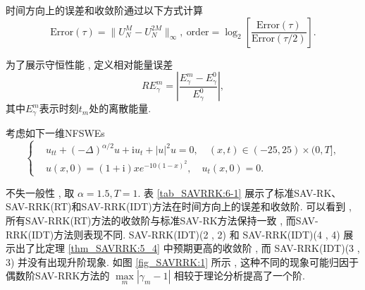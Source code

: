 时间方向上的误差和收敛阶通过以下方式计算
\begin{equation}
	\text{Error}(\tau) = \|U_{N}^{M}-U_{N}^{2 M}\|_{\infty} , ~\text{order} = \log_{2}\left[\frac{\text{Error}(\tau)}{\text{Error}(\tau / 2)}\right].\label{eq_SAVRRK:104}
\end{equation}

为了展示守恒性能 , 定义相对能量误差
\begin{equation}\label{eq_SAVRRK:105}
	R E_{\gamma}^{m} = \left|\frac{E_{\gamma}^{m}-E_{\gamma}^{0}}{E_{\gamma}^{0}}\right| , 
\end{equation}
其中$E_{\gamma}^{m}$表示时刻$t_m$处的离散能量.

\begin{example}\label{exp_SAVRRK:1} 
	考虑如下一维NFSWEs\cite{ranLinearlyImplicitConservative2016}
	\begin{equation}
		\begin{cases}
		&  u_{t t}+(-\Delta)^{\alpha / 2} u+\mathrm{i}u_t+|u|^2 u=0 , \quad (x , t)\in (-25 , 25)\times(0 , T] , \\
		& u(x , 0)=(1+\mathrm{i}) x e^{-10(1-x)^2} , \quad u_t(x , 0)=0 . 
		\end{cases}
	\end{equation}
\end{example}

	不失一般性 , 取 $\alpha=1.5,T=1$.%
	表 \ref{tab_SAVRRK:6-1} 展示了标准SAV-RK、SAV-RRK(RT)和SAV-RRK(IDT)方法在时间方向上的误差和收敛阶.
	可以看到 , 所有SAV-RRK(RT)方法的收敛阶与标准SAV-RK方法保持一致 , 而SAV-RRK(IDT)方法则表现不同.
	SAV-RRK(IDT)(2 , 2) 和 SAV-RRK(IDT)(4 , 4) 展示出了比定理 \ref{thm_SAVRRK:5_4} 中预期更高的收敛阶 , 
	而 SAV-RRK(IDT)(3 , 3) 并没有出现升阶现象. 如图 \ref{fig_SAVRRK:1} 所示 , 
	这种不同的现象可能归因于偶数阶SAV-RRK方法的 $\max\limits _m\left|\gamma_m-1\right|$ 
	相较于理论分析提高了一个阶.


